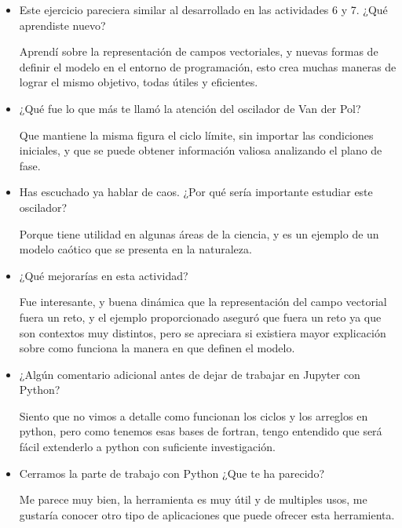 \documentclass[a4paper]{article}
\begin{document}
\begin{itemize}
\item     Este ejercicio pareciera similar al desarrollado en las actividades 6 y 7. ¿Qué aprendiste nuevo?

Aprendí sobre la representación de campos vectoriales, y nuevas formas de definir el modelo en el entorno de programación, esto crea muchas maneras de lograr el mismo objetivo, todas útiles y eficientes.

\item     ¿Qué fue lo que más te llamó la atención del oscilador de Van der Pol?

Que mantiene la misma figura el ciclo límite, sin importar las condiciones iniciales, y que se puede obtener información valiosa analizando el plano de fase.

\item     Has escuchado ya hablar de caos. ¿Por qué sería importante estudiar este oscilador?

Porque tiene utilidad en algunas áreas de la ciencia, y es un ejemplo de un modelo caótico que se presenta en la naturaleza.

\item     ¿Qué mejorarías en esta actividad?

Fue interesante, y buena dinámica que la representación del campo vectorial fuera un reto, y el ejemplo proporcionado aseguró que fuera un reto ya que son contextos muy distintos, pero se apreciara si existiera mayor explicación sobre como funciona la manera en que definen el modelo.

\item     ¿Algún comentario adicional antes de dejar de trabajar en Jupyter con Python?

Siento que no vimos a detalle como funcionan los ciclos y los arreglos en python, pero como tenemos esas bases de fortran, tengo entendido que será fácil extenderlo a python con suficiente investigación.

\item     Cerramos la parte de trabajo con Python ¿Que te ha parecido?

Me parece muy bien, la herramienta es muy útil y de multiples usos, me gustaría conocer otro tipo de aplicaciones que puede ofrecer esta herramienta.
\end{itemize}
\end{document}
